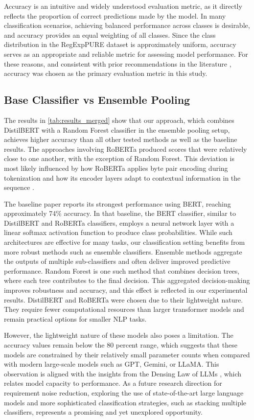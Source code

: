 \documentclass[sigconf,review]{acmart}
\begin{document}
Accuracy is an intuitive and widely understood evaluation metric, as it directly reflects the proportion of correct predictions made by the model. In many classification scenarios, achieving balanced performance across classes is desirable, and accuracy provides an equal weighting of all classes. Since the class distribution in the RegExpPURE dataset is approximately uniform, accuracy serves as an appropriate and reliable metric for assessing model performance. For these reasons, and consistent with prior recommendations in the literature \cite{sokolova2009systematic}, accuracy was chosen as the primary evaluation metric in this study.

\subsection{Base Classifier vs Ensemble Pooling}

The results in \autoref{tab:results_merged} show that our approach, which combines DistilBERT with a Random Forest classifier in the ensemble pooling setup, achieves higher accuracy than all other tested methods as well as the baseline results. The approaches involving RoBERTa produced scores that were relatively close to one another, with the exception of Random Forest. This deviation is most likely influenced by how RoBERTa applies byte pair encoding during tokenization and how its encoder layers adapt to contextual information in the sequence \cite{liu2019roberta}.

The baseline paper reports its strongest performance using BERT, reaching approximately 74\% accuracy. In that baseline, the BERT classifier, similar to DistilBERT and RoBERTa classifiers, employs a neural network layer with a linear softmax activation function to produce class probabilities. While such architectures are effective for many tasks, our classification setting benefits from more robust methods such as ensemble classifiers. Ensemble methods aggregate the outputs of multiple sub-classifiers and often deliver improved predictive performance. Random Forest is one such method that combines decision trees, where each tree contributes to the final decision. This aggregated decision-making improves robustness and accuracy, and this effect is reflected in our experimental results. DistilBERT and RoBERTa were chosen due to their lightweight nature. They require fewer computational resources than larger transformer models and remain practical options for smaller NLP tasks.

However, the lightweight nature of these models also poses a limitation. The accuracy values remain below the 80 percent range, which suggests that these models are constrained by their relatively small parameter counts when compared with modern large-scale models such as GPT, Gemini, or LLaMA. This observation is aligned with the insights from the Densing Law of LLMs \cite{xiao2025densing}, which relates model capacity to performance. As a future research direction for requirement noise reduction, exploring the use of state-of-the-art large language models and more sophisticated classification strategies, such as stacking multiple classifiers, represents a promising and yet unexplored opportunity.
\end{document}
